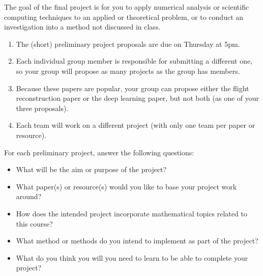 \documentclass[12pt,letterpaper,noanswers]{exam}
\begin{document}
 \pdfpageheight 11in 
  \pdfpagewidth 8.5in

The goal of the final project is for you to apply numerical analysis or scientific computing techniques to an applied or theoretical problem, or to conduct an investigation into a method not discussed in class.

\begin{enumerate}
\itemsep0pt
    \item The (short) preliminary project proposals are due on Thursday at 5pm.
    \item Each individual group member is responsible for submitting a different one, so your group will propose as many projects as the group has members.
    \item Because these papers are popular, your group can propose either the flight reconstruction paper or the deep learning paper, but not both (as one of your three proposals).
    \item Each team will work on a different project (with only one team per paper or resource).
\end{enumerate}


\noindent For each preliminary project, answer the following questions:
\begin{itemize}
\itemsep0pt
\item What will be the aim or purpose of the project?
\item What paper(s) or resource(s) would you like to base your project work around?
\item How does the intended project incorporate mathematical topics related to this course?
\item What method or methods do you intend to implement as part of the project?
\item What do you think you will you need to learn to be able to complete your project?
\end{itemize}
\end{document}
